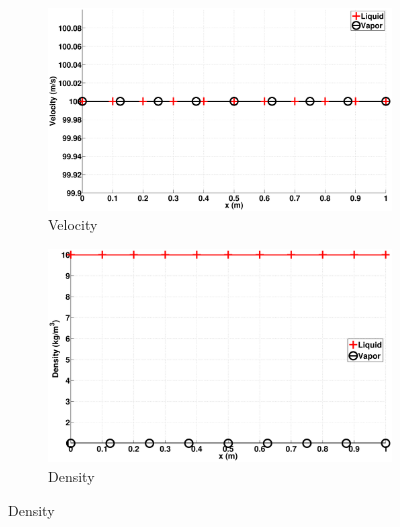 \documentclass[preprint,10pt]{elsarticle}
\begin{document}
%
\begin{figure}[H]
        \centering
        \begin{subfigure}[b]{0.495\textwidth}
                \centering
                \includegraphics[width=\textwidth]{figures/vf-shock_two_phases_velocity.eps}
                \caption{Velocity}
                \label{fig:adv-vf-vel}
        \end{subfigure}%
        \begin{subfigure}[b]{0.495\textwidth}
                \centering
                \includegraphics[width=\textwidth]{figures/vf-shock_two_phases_temperature.eps}
                \caption{Density}
                \label{fig:adv-vf-density}
        \end{subfigure}
        

\end{figure}
\end{document}
